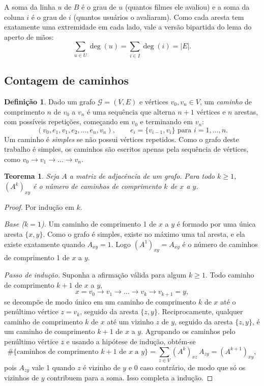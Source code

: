 \documentclass[12pt,a4paper]{article}
\newtheorem{teorema}{Teorema}
\theoremstyle{definition}
\newtheorem{definicao}{Definição}
\begin{document}
A soma da linha $u$ de $B$ é o grau de $u$ (quantos filmes ele avaliou) e a
soma da coluna $i$ é o grau de $i$ (quantos usuários o avaliaram). Como cada
aresta tem exatamente uma extremidade em cada lado, vale a versão bipartida
do lema do aperto de mãos:
\[
  \sum_{u \in U} \deg(u) = \sum_{i \in I} \deg(i) = |E|.
\]

\subsection{Contagem de caminhos}

\begin{definicao}
Dado um grafo $\mathcal{G} = (V, E)$ e vértices $v_0, v_n \in V$, um \emph{caminho} de
comprimento $n$ de $v_0$ a $v_n$ é uma sequência que alterna $n+1$ vértices e
$n$ arestas, com possíveis repetições, começando em $v_0$ e terminando em
$v_n$:
\[
  (v_0, e_1, v_1, e_2, \dots, e_n, v_n), \qquad e_i = \{v_{i-1}, v_i\}
  \text{ para } i = 1, \dots, n.
\]
Um caminho é \emph{simples} se não possui vértices repetidos. Como o grafo
deste trabalho é simples, os caminhos são escritos apenas pela sequência de
vértices, como $v_0 \to v_1 \to \dots \to v_n$.
\end{definicao}

\begin{teorema}\label{teo:caminhos}
Seja $A$ a matriz de adjacência de um grafo. Para todo $k \geq 1$,
$(A^k)_{xy}$ é o número de caminhos de comprimento $k$ de $x$ a $y$.
\end{teorema}

\begin{proof}
Por indução em $k$.

\emph{Base ($k = 1$).} Um caminho de comprimento 1 de $x$ a $y$ é formado
por uma única aresta $\{x, y\}$. Como o grafo é simples, existe no máximo
uma tal aresta, e ela existe exatamente quando $A_{xy} = 1$. Logo
$(A^1)_{xy} = A_{xy}$ é o número de caminhos de comprimento 1 de $x$ a $y$.

\emph{Passo de indução.} Suponha a afirmação válida para algum $k \geq 1$.
Todo caminho de comprimento $k+1$ de $x$ a $y$,
\[
  x = v_0 \to v_1 \to \dots \to v_k \to v_{k+1} = y,
\]
se decompõe de modo único em um caminho de comprimento $k$ de $x$ até o
penúltimo vértice $z = v_k$, seguido da aresta $\{z, y\}$. Reciprocamente,
qualquer caminho de comprimento $k$ de $x$ até um vizinho $z$ de $y$,
seguido da aresta $\{z, y\}$, é um caminho de comprimento $k+1$ de $x$ a
$y$. Agrupando os caminhos pelo penúltimo vértice $z$ e usando a hipótese
de indução, obtém-se
\[
  \#\{\text{caminhos de comprimento } k+1 \text{ de } x \text{ a } y\}
  = \sum_{z \in V} (A^k)_{xz}\, A_{zy}
  = (A^{k+1})_{xy},
\]
pois $A_{zy}$ vale 1 quando $z$ é vizinho de $y$ e 0 caso contrário, de
modo que só os vizinhos de $y$ contribuem para a soma. Isso completa a
indução.
\end{proof}
\end{document}
